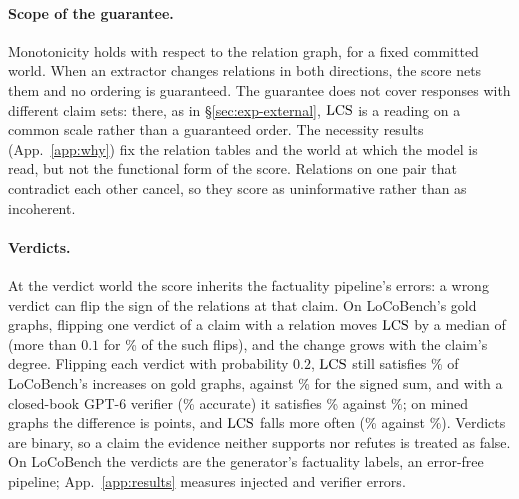 \paragraph{Scope of the guarantee.} Monotonicity holds with respect to the relation graph, for a
fixed committed world. When an extractor changes relations in both directions, the score nets them
and no ordering is guaranteed. The guarantee does not cover responses with different claim sets: there, as in \S\ref{sec:exp-external},
$\mathrm{LCS}$ is a reading on a common scale rather than a guaranteed order. The necessity results
(App.~\ref{app:why}) fix the relation tables and the world at which the model is read, but not the
functional form of the score. Relations on one pair that contradict each other cancel, so they
score as uninformative rather than as incoherent.

\paragraph{Verdicts.} At the verdict world the score inherits the factuality pipeline's errors: a
wrong verdict can flip the sign of the relations at that claim. On LoCoBench's gold graphs, flipping
one verdict of a claim with a relation moves $\mathrm{LCS}$ by a median of \flipMedian{} (more than $0.1$
for \flipOverTenth\% of the \flipTouched{} such flips), and the change grows with the claim's
degree. Flipping each verdict with probability $0.2$, $\mathrm{LCS}$ still satisfies \vnLcsIncTwenty\% of
LoCoBench's increases on gold graphs, against \vnWsumIncTwenty\% for the signed sum, and with a
closed-book GPT-6 verifier (\vfGptAcc\% accurate) it satisfies \vfGptGoldLcsInc\% against
\vfGptGoldWsumInc\%; on mined graphs the difference is \asapCI{\vfGptMinedDiffloInc}{\vfGptMinedDiffhiInc} points, and $\mathrm{LCS}$
falls more often (\vfGptMinedLcsfallInc\% against \vfGptMinedWsumfallInc\%). Verdicts are binary, so a claim the
evidence neither supports nor refutes is treated as false. On LoCoBench the verdicts are the
generator's factuality labels, an error-free pipeline; App.~\ref{app:results} measures injected and
verifier errors.

